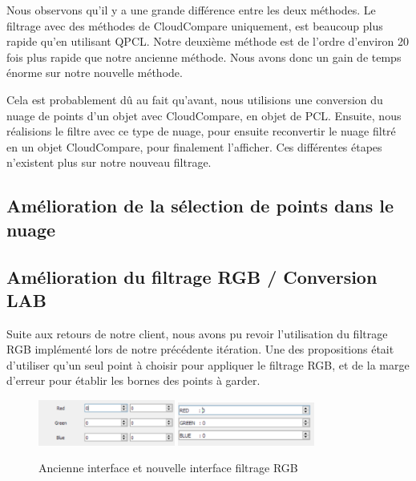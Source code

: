 \documentclass[12pt,titlepage,french]{article}
\begin{document}
Nous observons qu'il y a une grande différence entre les deux méthodes. Le filtrage avec des méthodes de CloudCompare uniquement, est beaucoup plus rapide qu'en utilisant QPCL. Notre deuxième méthode est de l'ordre d'environ 20 fois plus rapide que notre ancienne méthode. Nous avons donc un gain de temps énorme sur notre nouvelle méthode. \newline

Cela est probablement dû au fait qu'avant, nous utilisions une conversion du nuage de points d'un objet avec CloudCompare, en objet de PCL. Ensuite, nous réalisions le filtre avec ce type de nuage, pour ensuite reconvertir le nuage filtré en un objet CloudCompare, pour finalement l'afficher. Ces différentes étapes n'existent plus sur notre nouveau filtrage.

\subsection{Amélioration de la sélection de points dans le nuage}


\subsection{Amélioration du filtrage RGB / Conversion LAB}

Suite aux retours de notre client, nous avons pu revoir l'utilisation du filtrage RGB implémenté lors de notre précédente itération. Une des propositions était d'utiliser qu'un seul point à choisir pour appliquer le filtrage RGB, et de la marge d'erreur pour établir les bornes des points à garder. \newline

\begin{figure}[!hbtp]
  \caption{\label{} Ancienne interface et nouvelle interface filtrage RGB}
  \includegraphics[width=0.4\textwidth]{./img/rgb_old.png}
\hspace*{1in}
\includegraphics[width=0.4\textwidth]{./img/rgb_new.png}
\end{figure}
\end{document}
